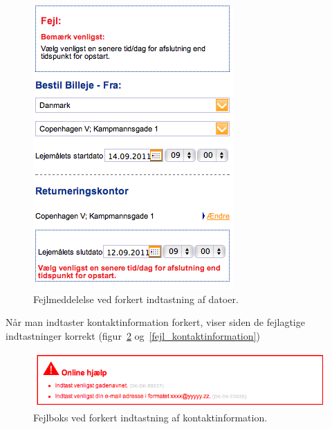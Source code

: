 \documentclass[a4paper]{article}
\begin{document}
\begin{figure}[htbp]
  \begin{center}
    \includegraphics[scale=.6]{6.png}
  \end{center}
  \caption{Fejlmeddelelse ved forkert indtastning af datoer.}
  \label{fejl_datoer}
\end{figure}

Når man indtaster kontaktinformation forkert, viser siden de fejlagtige
indtastninger korrekt (figur~\ref{fejl_boks} og~\ref{fejl_kontaktinformation})

\begin{figure}[htbp]
  \begin{center}
    \includegraphics[scale=.6]{10.png}
  \end{center}
  \caption{Fejlboks ved forkert indtastning af kontaktinformation.}
  \label{fejl_boks}
\end{figure}
\end{document}
